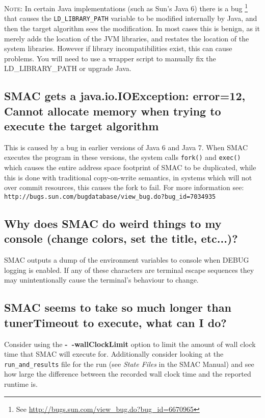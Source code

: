\documentclass[11pt,letterpaper,oneside]{article}
\begin{document}
\textsc{Note:} In certain Java implementations (such as Sun's Java 6) there is a bug \footnote{See \url{http://bugs.sun.com/view_bug.do?bug_id=6670965}} that causes the \texttt{LD\_LIBRARY\_PATH} variable to be modified internally by Java, and then the target algorithm sees the modification. In most cases this is benign, as it merely adds the location of the JVM libraries, and restates the location of the system libraries. However if library incompatibilities exist, this can cause problems. You will need to use a wrapper script to manually fix the LD\_LIBRARY\_PATH or upgrade Java.

\subsection{SMAC gets a java.io.IOException: error=12, Cannot allocate memory when trying to execute the target algorithm}

This is caused by a bug in earlier versions of Java 6 and Java 7. When SMAC executes the program in these versions, the system calls \texttt{fork()} and \texttt{exec()} which causes the entire address space footprint of SMAC to be duplicated, while this is done with traditional copy-on-write semantics, in systems which will not over commit resources, this causes the fork to fail. For more information see: \texttt{http://bugs.sun.com/bugdatabase/view\_bug.do?bug\_id=7034935}

\subsection{Why does SMAC do weird things to my console (change colors, set the title, etc...)?}

SMAC outputs a dump of the environment variables to console when DEBUG logging is enabled. If any of these characters are terminal escape sequences they may unintentionally cause the terminal's behaviour to change.

\subsection{SMAC seems to take so much longer than tunerTimeout to execute, what can I do?}

	Consider using the \textbf{-~$\!$-wallClockLimit} option to limit the amount of wall clock time that SMAC will execute for. Additionally consider looking at the \texttt{run\_and\_results} file for the run (see \emph{State Files} in the SMAC Manual) and see how large the difference between the recorded wall clock time and the reported runtime is.
\end{document}
